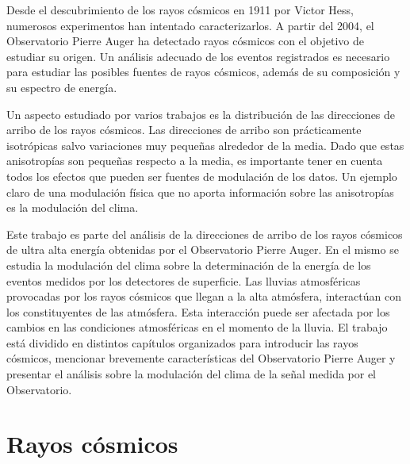


Desde el descubrimiento de los rayos cósmicos en 1911 por Victor Hess, numerosos experimentos han intentado caracterizarlos. A partir del 2004, el Observatorio Pierre Auger ha detectado rayos cósmicos con el objetivo de estudiar su origen. Un análisis adecuado de los eventos registrados es necesario para estudiar las posibles fuentes de rayos cósmicos, además de su composición y su espectro de energía.

Un aspecto estudiado por varios trabajos \cite{collaboration2013pierre} \cite{data} es la distribución  de las direcciones de arribo de los rayos cósmicos. Las direcciones de arribo son prácticamente isotrópicas salvo variaciones muy pequeñas alrededor de la media. Dado que estas  anisotropías son pequeñas respecto a la media, es importante tener en cuenta todos los efectos que pueden ser fuentes de modulación de los datos. Un ejemplo claro de una modulación física que no aporta información sobre las anisotropías es la modulación del clima.

Este trabajo es parte del análisis de la direcciones de arribo de los rayos cósmicos de ultra alta energía obtenidas por el Observatorio Pierre Auger. En el mismo se estudia la modulación del clima sobre la determinación de la energía de los eventos medidos por los detectores de superficie. Las lluvias atmosféricas provocadas por los rayos cósmicos que llegan a la alta atmósfera, interactúan con los constituyentes de las atmósfera. Esta interacción puede ser afectada por los cambios en las condiciones atmosféricas en el momento de la lluvia. El trabajo está dividido en distintos capítulos organizados para introducir las rayos cósmicos, mencionar brevemente características del Observatorio Pierre Auger y presentar el análisis sobre la modulación del clima de la señal medida por el Observatorio.

\chapter{Rayos cósmicos}

